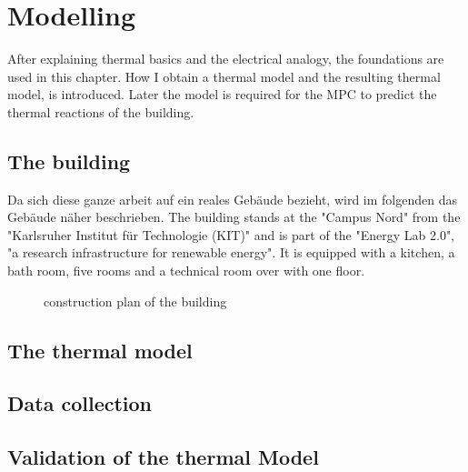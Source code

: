\chapter{Modelling}
\label{ch:modelling}
After explaining thermal basics and the electrical analogy, the foundations are used in this chapter. How I obtain a thermal model and the resulting thermal model, is introduced. Later the model is required for the MPC to predict the thermal reactions of the building. 

\section{The building}
\label{section:building}
Da sich diese ganze arbeit auf ein reales Gebäude bezieht, wird im folgenden das Gebäude näher beschrieben.
\newline
The building stands at the "Campus Nord" from the "Karlsruher Institut für Technologie (KIT)" and is part of the "Energy Lab 2.0", "a research infrastructure for renewable energy"\cite{KIT.2021}. It is equipped with a kitchen, a bath room, five rooms and a technical room over with one floor.

\begin{figure}
    \centering
    
    \caption{construction plan of the building \cite{Bauplan}}
    \label{Bauplan}
\end{figure}
\section{The thermal model}
\label{thermalmodel}

\section{Data collection}

\section{Validation of the thermal Model}
\label{validationthermalmodel}



